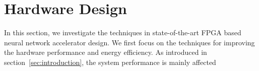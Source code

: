 \section{Hardware Design}\label{sec:hardware}

In this section, we investigate the techniques in state-of-the-art FPGA based neural network accelerator design. We first focus on the techniques for improving the hardware performance and energy efficiency. As introduced in section~\ref{sec:introduction}, the system performance is mainly affected 